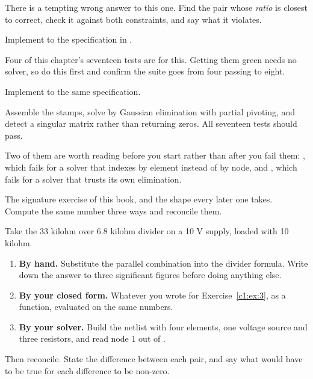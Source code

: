 There is a tempting wrong answer to this one. Find the pair whose \emph{ratio} is closest to correct, check it against both constraints, and say what it violates.


\label{c1:ex:6}
Implement  to the specification in .

Four of this chapter's seventeen tests are for this. Getting them green needs no solver, so do this first and confirm the suite goes from four passing to eight.

\label{c1:ex:7}
Implement  to the same specification.

Assemble the stamps, solve by Gaussian elimination with partial pivoting, and detect a singular matrix rather than returning zeros. All seventeen tests should pass.

Two of them are worth reading before you start rather than after you fail them: , which fails for a solver that indexes by element instead of by node, and , which fails for a solver that trusts its own elimination.

\label{c1:ex:8}
The signature exercise of this book, and the shape every later one takes. Compute the same number three ways and reconcile them.

Take the 33 kilohm over 6.8 kilohm divider on a 10 V supply, loaded with 10 kilohm.

\begin{enumerate}
  \item \textbf{By hand.} Substitute the parallel combination into the divider formula. Write down the answer to three significant figures before doing anything else.
  \item \textbf{By your closed form.} Whatever you wrote for Exercise~\ref{c1:ex:3}, as a function, evaluated on the same numbers.
  \item \textbf{By your solver.} Build the netlist with four elements, one voltage source and three resistors, and read node 1 out of .
\end{enumerate}
Then reconcile. State the difference between each pair, and say what would have to be true for each difference to be non-zero.

